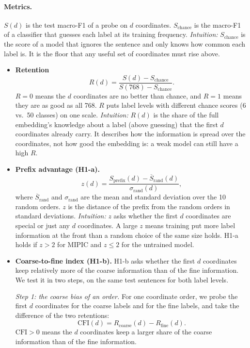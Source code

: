 \paragraph{Metrics.}
$S(d)$ is the test macro-F1 of a probe on $d$ coordinates.
$S_{\text{chance}}$ is the macro-F1 of a classifier that guesses each label at its training frequency.
\emph{Intuition:} $S_{\text{chance}}$ is the score of a model that ignores the sentence and only knows how common each label is.
It is the floor that any useful set of coordinates must rise above.
\begin{itemize}
  \item \textbf{Retention}
  \[
    R(d)=\frac{S(d)-S_{\text{chance}}}{S(768)-S_{\text{chance}}}.
  \]
  $R{=}0$ means the $d$ coordinates are no better than chance, and $R{=}1$ means they are as good as all 768.
  $R$ puts label levels with different chance scores (6 vs.\ 50 classes) on one scale.
  \emph{Intuition:} $R(d)$ is the share of the full embedding's knowledge about a label (above guessing) that the first $d$ coordinates already carry.
  It describes how the information is spread over the coordinates, not how good the embedding is: a weak model can still have a high $R$.

  \item \textbf{Prefix advantage (H1-a).}
  \[
    z(d)=\frac{S_{\text{prefix}}(d)-\overline{S}_{\text{rand}}(d)}{\sigma_{\text{rand}}(d)},
  \]
  where $\overline{S}_{\text{rand}}$ and $\sigma_{\text{rand}}$ are the mean and standard deviation over the 10 random orders.
  $z$ is the distance of the prefix from the random orders in standard deviations.
  \emph{Intuition:} $z$ asks whether the first $d$ coordinates are special or just any $d$ coordinates.
  A large $z$ means training put more label information at the front than a random choice of the same size holds.
  H1-a holds if $z>2$ for MIPIC and $z\le 2$ for the untrained model.

  \item \textbf{Coarse-to-fine index (H1-b).}
  H1-b asks whether the first $d$ coordinates keep relatively more of the coarse information than of the fine information.
  We test it in two steps, on the same test sentences for both label levels.

  \emph{Step 1: the coarse bias of an order.}
  For one coordinate order, we probe the first $d$ coordinates for the coarse labels and for the fine labels, and take the difference of the two retentions:
  \[
    \text{CFI}(d)=R_{\text{coarse}}(d)-R_{\text{fine}}(d).
  \]
  $\text{CFI}>0$ means the $d$ coordinates keep a larger share of the coarse information than of the fine information.


\end{itemize}
